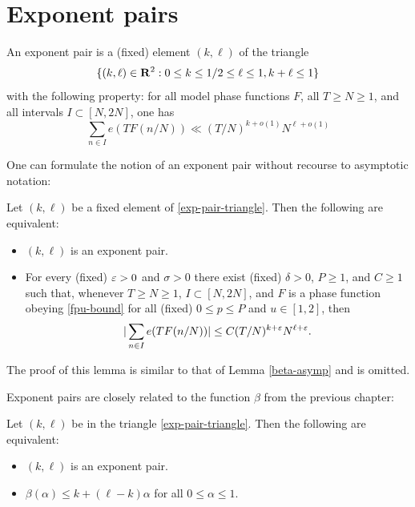 \chapter{Exponent pairs}\label{exponent-pairs-chapter}

\begin{definition}\label{exp-pair-def}
\leanok
An exponent pair is a (fixed) element $(k,\ell)$ of the triangle
\begin{equation}\label{exp-pair-triangle}
    \{ (k,\ell) \in \mathbf{R}^2: 0 \leq k \leq 1/2 \leq \ell \leq 1, k+\ell \leq 1 \}
\end{equation}
with the following property: for all model phase functions $F$, all $T \geq N \geq 1$, and all intervals $I \subset [N,2N]$, one has
\begin{equation}\label{ntf}
 \sum_{n \in I} e(T F(n/N)) \ll (T/N)^{k+o(1)} N^{\ell+o(1)}
\end{equation}
\end{definition}


One can formulate the notion of an exponent pair without recourse to asymptotic notation:

\begin{lemma}  Let $(k,\ell)$ be a fixed element of \eqref{exp-pair-triangle}.  Then the following are equivalent:
    \begin{itemize}
    \item[(i)] $(k,\ell)$ is an exponent pair.
    \item[(ii)] For every (fixed) $\varepsilon>0$ and $\sigma>0$ there exist (fixed) $\delta>0$, $P \geq 1$, and $C \geq 1$ such that, whenever $T \geq N \geq 1$, $I \subset [N,2N]$, and $F$ is a phase function obeying \eqref{fpu-bound} for all (fixed) $0 \leq p \leq P$ and $u \in [1,2]$, then
    $$ |\sum_{n \in I} e(T F(n/N))| \leq C (T/N)^{k+\varepsilon} N^{\ell+\varepsilon}.$$
   \end{itemize}
\end{lemma}

The proof of this lemma is similar to that of Lemma \ref{beta-asymp} and is omitted.

Exponent pairs are closely related to the function $\beta$ from the previous chapter:

\begin{lemma}\label{beta-duality}
\leanok
Let $(k,\ell)$ be in the triangle \eqref{exp-pair-triangle}.  Then the following are equivalent:
    \begin{itemize}
    \item[(i)] $(k,\ell)$ is an exponent pair.
    \item[(ii)] $\beta(\alpha) \leq k + (\ell-k)\alpha$ for all $0 \leq \alpha \leq 1$.
    \end{itemize}
    \end{lemma}

